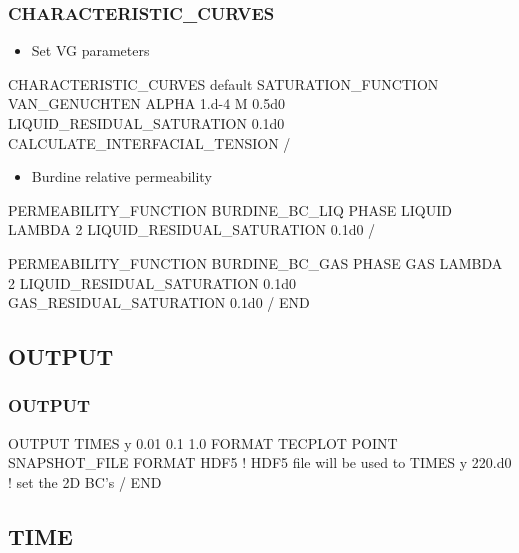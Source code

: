 \documentclass{beamer}
\newcommand\bluecomment[1]{{{\color{blue} #1}}}
\begin{document}
\begin{frame}\frametitle{CHARACTERISTIC\_CURVES}

\begin{itemize}
\item Set VG parameters
\end{itemize}

\begin{semiverbatim}
CHARACTERISTIC_CURVES default
  SATURATION_FUNCTION VAN_GENUCHTEN
      ALPHA 1.d-4
      M 0.5d0
      LIQUID_RESIDUAL_SATURATION 0.1d0
      CALCULATE_INTERFACIAL_TENSION
    /
\end{semiverbatim}

\newpage
\begin{itemize}
\item Burdine relative permeability
\end{itemize}

\begin{semiverbatim}
  PERMEABILITY_FUNCTION BURDINE_BC_LIQ
    PHASE LIQUID
    LAMBDA 2
    LIQUID_RESIDUAL_SATURATION 0.1d0
  /

  PERMEABILITY_FUNCTION BURDINE_BC_GAS
    PHASE GAS
    LAMBDA 2
    LIQUID_RESIDUAL_SATURATION 0.1d0
    GAS_RESIDUAL_SATURATION 0.1d0
  /
END
\end{semiverbatim}

\end{frame}

\subsection{OUTPUT}

\begin{frame}[fragile]\frametitle{OUTPUT}

\begin{semiverbatim}
OUTPUT
  TIMES y 0.01 0.1 1.0
  FORMAT TECPLOT POINT
  SNAPSHOT_FILE
    FORMAT HDF5 \bluecomment{! HDF5 file will be used to} 
    TIMES y 220.d0 \bluecomment{! set the 2D BC's}
  /
END
\end{semiverbatim}

\end{frame}

\subsection{TIME}
\end{document}

